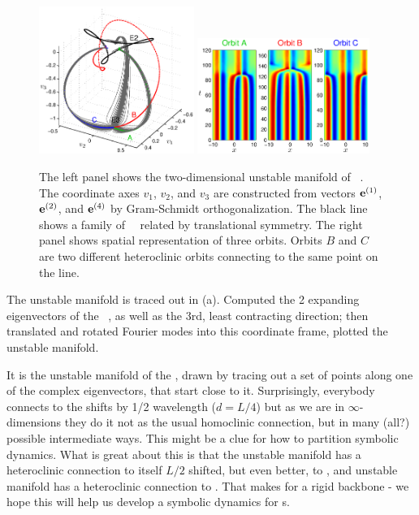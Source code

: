 \begin{figure}[t]
\begin{center}
\includegraphics[width=0.45\textwidth]{figs/ks22_E3_manifold.eps}
\includegraphics[width=0.5\textwidth]{figs/ks22_E3_orbits.eps}
\end{center}
\caption{
The left panel shows the two-dimensional
unstable manifold of \eqv\ . The coordinate axes
$v_1$, $v_2$, and $v_3$ are constructed from vectors
${\mathbf e}^{(1)}$, ${\mathbf e}^{(2)}$, and ${\mathbf e}^{(4)}$ by Gram-Schmidt orthogonalization.
The black line shows a family of ~\eqva\ related by translational
symmetry.
The right panel shows spatial representation of
three orbits. Orbits $B$ and $C$ are two different heteroclinic orbits
connecting  to the same point on the  line.
        }
\label{f:KS22E3man}
\end{figure}



The unstable manifold is traced out in
(a). Computed the 2 expanding eigenvectors
of the \eqv~, as well as the 3rd, least contracting
direction; then translated and rotated Fourier modes into this
coordinate frame, plotted the unstable manifold.

 It is the unstable manifold of the 
{\eqv}, drawn by tracing out a set of points along one of the complex
eigenvectors, that start close to it. Surprisingly, everybody connects
to the  shifts by 1/2 wavelength ($d = L/4$) but as we are in
$\infty$-dimensions they do it not as the usual homoclinic connection, but in
many (all?) possible intermediate ways. This might be a clue for how to
partition symbolic dynamics.
What is great about
this is that the  unstable manifold has a heteroclinic connection to itself
$L/2$ shifted, but
even better, to , and  unstable manifold has a heteroclinic
connection to .
That makes for a rigid backbone -
we hope this will help us develop a symbolic dynamics for \rpo s.

